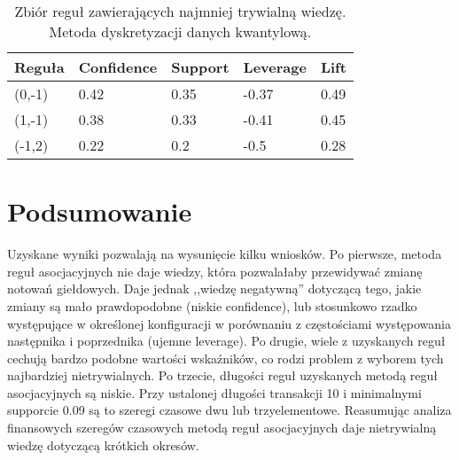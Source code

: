 \documentclass[a4paper,10pt]{article}
\begin{document}
\begin{center}
\begin{table}
\centering
\caption{Zbiór reguł zawierających najmniej trywialną wiedzę. Metoda dyskretyzacji danych kwantylową.}
\begin{tabular}{|l|l|l|l|l|} 
\hline
\bf{Reguła} & \bf{Confidence} & \bf{Support} & \bf{Leverage} & \bf{Lift} \\ \hline
(0,-1) & 0.42 & 0.35 & -0.37 & 0.49  \\ \hline
(1,-1) & 0.38 & 0.33 & -0.41 & 0.45 \\ \hline
(-1,2) & 0.22 & 0.2 & -0.5 & 0.28 \\ \hline
\end{tabular}
\label{tab:k2}
\end{table}
\end{center}

\section{Podsumowanie}

Uzyskane wyniki pozwalają na wysunięcie kilku wniosków. Po pierwsze, metoda reguł asocjacyjnych nie daje wiedzy, która pozwalałaby przewidywać zmianę notowań
giełdowych. Daje jednak ,,wiedzę negatywną'' dotyczącą tego, jakie zmiany są mało prawdopodobne (niskie confidence), lub stosunkowo rzadko występujące w określonej konfiguracji w porównaniu z częstościami występowania następnika i poprzednika (ujemne leverage). Po drugie, wiele z uzyskanych reguł cechują bardzo podobne wartości wskaźników, co rodzi problem z wyborem tych najbardziej 
nietrywialnych. Po trzecie, długości reguł uzyskanych metodą reguł asocjacyjnych są niskie. Przy ustalonej długości transakcji 10 i minimalnymi supporcie 0.09 są to szeregi czasowe dwu lub trzyelementowe. Reasumując analiza finansowych szeregów czasowych metodą reguł asocjacyjnych daje nietrywialną wiedzę dotyczącą krótkich okresów.
\end{document}
